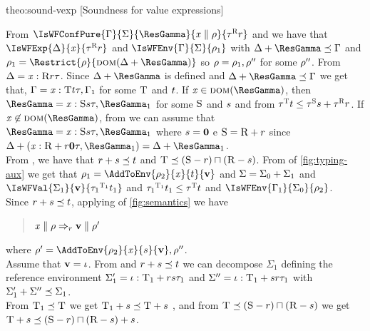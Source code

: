 \begin{proofOf}{theo:sound-vexp} [Soundness for value expressions]
\begin{description}
From $\IsWFConfPure{\Gamma}{\Sigma}{\ResGamma}{\VConf{\x}{\env}}{\Graded{\tau}{\Rgr}{\rgr}}$ and  we have that
$\IsWFExp{\Delta}{\x}{\Graded{\tau}{\Rgr}{\rgr}}$ and $\IsWFEnv{\Gamma}{\Sigma}{\env_1}$ with $\Delta\ctxsum\ResGamma\ctxord\Gamma$ and $\env_1=\Restrict{\env}{\dom{\Delta\ctxsum\ResGamma}}$ so $\rho=\rho_1,\rho''$ for some $\rho''$.
%
From   $\Delta=\mathit{x} :\textsc{R}{r}{\tau}$. 
Since $\Delta\ctxsum\ResGamma$ is defined and $\Delta\ctxsum\ResGamma\ctxord\Gamma$ we get that, 
 $\Gamma=\mathit{x} :\textsc{T}{t}{\tau},\Gamma_1$ for some $\textsc{T}$ and $t$.
 If $\x\in\dom{\ResGamma}$,  then $\ResGamma=\CtxElem{\x}{\Sgr}{\sgr}{\tau},\ResGamma_1$ for some $\textsc{S}$ and $s$
 and from  $\tau^{\textsc{T}}{t}\leq\tau^{\textsc{S}}{s}+\tau^{\textsc{R}}{r}$.
 If $\x\not\in\dom{\ResGamma}$, from  we can assume that $\ResGamma=\CtxElem{\x}{\Sgr}{\sgr}{\tau},\ResGamma_1$ where
 $s=\mathbf{0}$ e $\textsc{S}=\textsc{R}+r$ since $\Delta\ctxsum(\CtxElem{\x}{\Rgr\ctxsum\rgr}{\rzero}{\tau},\ResGamma_1)=\Delta\ctxsum\ResGamma_1$.\\
From , we have that $r+s\preceq t$ and    $\textsc{T}\preceq(\textsc{S}-r)\sqcap(\textsc{R}-s)$.
From  of \cref{fig:typing-aux} we get  that $\env_1=\AddToEnv{\env_2}{\x}{\tgr}{\val}$ and $\Sigma=\Sigma_0+\Sigma_1$ and 
 $\IsWFVal{\Sigma_1}{\val}{\Graded{{\tau_1}}{\Tgr_1}{\tgr_1}}$ and 
 ${\tau_1}^{\textsc{T}_1}{t_1}\leq\tau^{\textsc{T}}{t}$ 
and $\IsWFEnv{\Gamma_1}{\Sigma_0}{\env_2}$. \\
%
Since $r+s\preceq t$, applying   of \cref{fig:semantics} we have
\begin{quote}
$\mathit{x}\parallel\rho\Rightarrow_{r}\mathbf{v}\parallel\rho'$  
\end{quote}
where $\env'=\AddToEnv{\env_2}{\x}{\sgr}{\val},\env''$.\\
%
Assume that $\mathbf{v}=\iota$.
From  and $r+s\preceq t$ we can decompose $\Sigma_1$ defining the reference
environment
$\Sigma'_1=\iota :\textsc{T}_1+r{s}{\tau_1}$ and $\Sigma''=\iota :\textsc{T}_1+s{r}{\tau_1}$
with $\Sigma'_1+\Sigma''\preceq\Sigma_1$.\\
From  $\textsc{T}_1\preceq\textsc{T}$ we get $\textsc{T}_1+s\preceq\textsc{T}+s$ , and from $\textsc{T}\preceq(\textsc{S}-r)\sqcap(\textsc{R}-s)$ we get  $\textsc{T}+s\preceq(\textsc{S}-r)\sqcap(\textsc{R}-s)+s$.

\end{description}
\end{proofOf}
